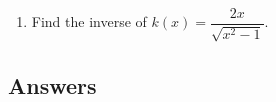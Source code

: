 \documentclass{ximera}
\begin{document}
\begin{enumerate}
\begin{enumerate}

\item Find the applied domain of the function.

\item Compute $m(.1c), \, m(.5c), \, m(.9c)$ and $m(.999c)$.

\item As $v \rightarrow c^{-}$, what happens to $m(x)$?

\item How slowly must the object be traveling so that the observed mass is no greater than 100 times its mass at rest?

\end{enumerate}


\item Find the inverse of $k(x) = \dfrac{2x}{\sqrt{x^{2} - 1}}$.


\end{enumerate}

\newpage

\subsection{Answers}
\end{document}
